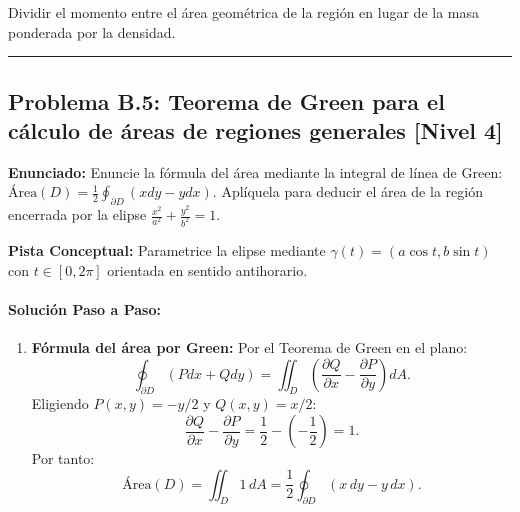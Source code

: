 \documentclass[11pt,a4paper]{article}
\begin{document}
\begin{trapbox}
Dividir el momento entre el área geométrica de la región en lugar de la masa ponderada por la densidad.
\end{trapbox}

\vspace{0.5cm}
\hrule
\vspace{0.5cm}

\subsection*{Problema B.5: Teorema de Green para el cálculo de áreas de regiones generales \hfill \color{primaryblue}\small[Nivel 4]}

\begin{tcolorbox}[colback=white,colframe=gray!40,arc=1mm,boxrule=0.5pt,left=3mm,right=3mm,top=2mm,bottom=2mm]
\textbf{Enunciado:} Enuncie la fórmula del área mediante la integral de línea de Green: $\text{Área}(D) = \frac{1}{2} \oint_{\partial D} (x dy - y dx)$. Aplíquela para deducir el área de la región encerrada por la elipse $\frac{x^2}{a^2} + \frac{y^2}{b^2} = 1$.
\end{tcolorbox}

\begin{tcolorbox}[colback=yellow!4,colframe=accentamber!70,arc=1mm,boxrule=0.5pt,left=3mm,right=3mm,top=1.5mm,bottom=1.5mm]
\textbf{Pista Conceptual:} Parametrice la elipse mediante $\gamma(t) = (a\cos t, b\sin t)$ con $t \in [0, 2\pi]$ orientada en sentido antihorario.
\end{tcolorbox}

\paragraph{Solución Paso a Paso:}\par
\begin{enumerate}[label=\textbf{\arabic*.}]
\item \textbf{Fórmula del área por Green:}
Por el Teorema de Green en el plano:
\begin{equation*}
\oint_{\partial D} (P dx + Q dy) = \iint_D \left(\frac{\partial Q}{\partial x} - \frac{\partial P}{\partial y}\right) dA.
\end{equation*}
Eligiendo $P(x,y) = -y/2$ y $Q(x,y) = x/2$:
\begin{equation*}
\frac{\partial Q}{\partial x} - \frac{\partial P}{\partial y} = \frac{1}{2} - \left(-\frac{1}{2}\right) = 1.
\end{equation*}
Por tanto:
\begin{equation*}
\text{Área}(D) = \iint_D 1 \, dA = \frac{1}{2} \oint_{\partial D} (x \, dy - y \, dx).
\end{equation*}
\end{enumerate}
\end{document}
